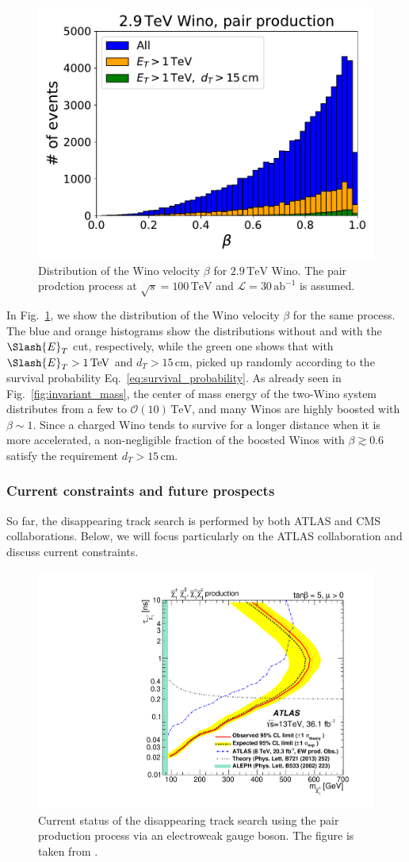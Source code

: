 \documentclass[12pt,twoside,book]{article}
\begin{document}
\begin{figure}[t]
  \centering
  \includegraphics[width=0.5\hsize]{beta.pdf}
  \caption{
    Distribution of the Wino velocity $\beta$ for $2.9\,\mathrm{TeV}$ Wino.
    The pair prodction process at $\sqrt{s}=100\,\mathrm{TeV}$ and $\mathcal{L} = 30\,\mathrm{ab}^{-1}$ is assumed.
  }
  \label{fig:beta}
\end{figure}

In Fig.~\ref{fig:beta}, we show the distribution of the Wino velocity $\beta$ for the same process.
The blue and orange histograms show the distributions without and with the $\Slash{E}_T$ cut, respectively, while the green one shows that with $\Slash{E}_T > 1\,\mathrm{TeV}$ and $d_T > 15\,\mathrm{cm}$, picked up randomly according to the survival probability Eq.~\eqref{eq:survival_probability}.
As already seen in Fig.~\ref{fig:invariant_mass}, the center of mass energy of the two-Wino system distributes from a few to $\mathcal{O} (10) \,\mathrm{TeV}$, and many Winos are highly boosted with $\beta \sim 1$.
Since a charged Wino tends to survive for a longer distance when it is more accelerated, a non-negligible fraction of the boosted Winos with $\beta \gtrsim 0.6$ satisfy the requirement $d_T > 15\,\mathrm{cm}$.


\subsubsection*{Current constraints and future prospects}

So far, the disappearing track search is performed by both ATLAS \cite{Aaboud:2017mpt} and CMS \cite{Sirunyan:2018ldc} collaborations.
Below, we will focus particularly on the ATLAS collaboration and discuss current constraints.

\begin{figure}[t]
  \centering
  \includegraphics[width=0.5\hsize]{ATLAS_disappearing_track.pdf}
  \caption{
    Current status of the disappearing track search using the pair production process via an electroweak gauge boson.
    The figure is taken from \cite{Aaboud:2017mpt}.
  }
  \label{fig:ATLAS_disappearing_track}
\end{figure}
\end{document}
